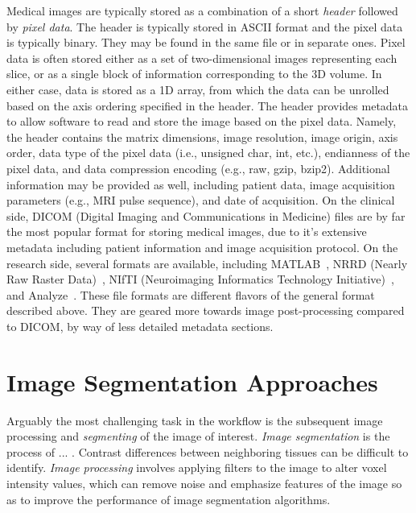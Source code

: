 Medical images are typically stored as a combination of a short \textit{header} followed by \textit{pixel data}. The header is typically stored in ASCII format and the pixel data is typically binary. They may be found in the same file or in separate ones. Pixel data is often stored either as a set of two-dimensional images representing each slice, or as a single block of information corresponding to the 3D volume. In either case, data is stored as a 1D array, from which the data can be unrolled based on the axis ordering specified in the header. The header provides metadata to allow software to read and store the image based on the pixel data. Namely, the header contains the matrix dimensions, image resolution, image origin, axis order, data type of the pixel data (i.e., unsigned char, int, etc.), endianness of the pixel data, and data compression encoding (e.g., raw, gzip, bzip2). Additional information may be provided as well, including patient data, image acquisition parameters (e.g., MRI pulse sequence), and date of acquisition. On the clinical side, DICOM (Digital Imaging and Communications in Medicine) files are by far the most popular format for storing medical images, due to it's extensive metadata including patient information and image acquisition protocol. On the research side, several formats are available, including MATLAB~\cite{MATLAB}, NRRD (Nearly Raw Raster Data)~\cite{nrrd}, NIfTI (Neuroimaging Informatics Technology Initiative)~\cite{nifti}, and Analyze~\cite{analyzedirect}. These file formats are different flavors of the general format described above. They are geared more towards image post-processing compared to DICOM, by way of less detailed metadata sections.


\section{Image Segmentation Approaches}
\label{Image Segmentation Approaches}

Arguably the most challenging task in the workflow is the subsequent image processing and \textit{segmenting} of the image of interest. \textit{Image segmentation} is the process of ... . Contrast differences between neighboring tissues can be difficult to identify. \textit{Image processing} involves applying filters to the image to alter voxel intensity values, which can remove noise and emphasize features of the image so as to improve the performance of image segmentation algorithms.

